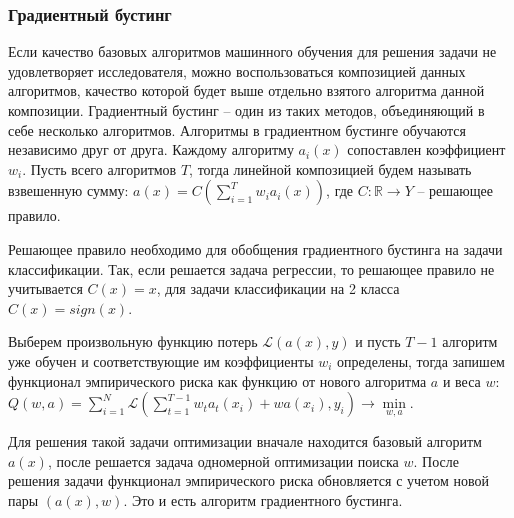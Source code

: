 \subsubsection{Градиентный бустинг}

Если качество базовых алгоритмов машинного обучения для решения задачи не удовлетворяет исследователя, можно воспользоваться композицией данных алгоритмов, качество которой будет выше отдельно взятого алгоритма данной композиции. Градиентный бустинг -- один из таких методов, объединяющий в себе несколько алгоритмов. Алгоритмы в градиентном бустинге обучаются независимо друг от друга. Каждому алгоритму $a_i(x)$ сопоставлен коэффициент $w_i$. Пусть всего алгоритмов $T$, тогда линейной композицией будем называть взвешенную сумму: $a(x) = C\left( \sum\limits_{i = 1}^{T} w_i a_i(x) \right)$, где $C:\mathbb{R} \rightarrow Y$ -- решающее правило.

Решающее правило необходимо для обобщения градиентного бустинга на задачи классификации. Так, если решается задача регрессии, то решающее правило не учитывается $C(x) = x$, для задачи классификации на 2 класса $C(x) = sign(x)$.

Выберем произвольную функцию потерь $\mathcal{L}(a(x), y)$ и пусть $T - 1$ алгоритм уже обучен и соответствующие им коэффициенты $w_i$ определены, тогда запишем функционал эмпирического риска как функцию от нового алгоритма $a$ и веса $w$: $Q(w, a) = \sum\limits_{i = 1}^{N} \mathcal{L}\left( \sum\limits_{t = 1}^{T-1}w_t a_t(x_i) + w a(x_i), y_i \right) \rightarrow \min\limits_{w, a}$.

Для решения такой задачи оптимизации вначале находится базовый алгоритм $a(x)$, после решается задача одномерной оптимизации поиска $w$. После решения задачи функционал эмпирического риска обновляется с учетом новой пары $(a(x), w)$. Это и есть алгоритм градиентного бустинга.





















